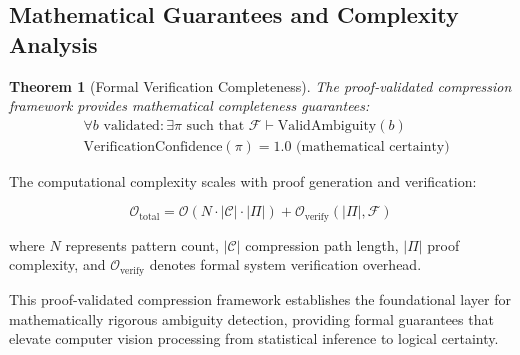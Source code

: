 \documentclass[11pt,a4paper]{article}
\newtheorem{theorem}{Theorem}[section]
\begin{document}
\subsection{Mathematical Guarantees and Complexity Analysis}

\begin{theorem}[Formal Verification Completeness]
The proof-validated compression framework provides mathematical completeness guarantees:
\begin{align}
&\forall b \text{ validated}: \exists \pi \text{ such that } \mathcal{F} \vdash \text{ValidAmbiguity}(b) \label{eq:completeness}\\
&\text{VerificationConfidence}(\pi) = 1.0 \text{ (mathematical certainty)} \label{eq:certainty}
\end{align}
\end{theorem}

The computational complexity scales with proof generation and verification:

\begin{equation}
\mathcal{O}_{\text{total}} = \mathcal{O}(N \cdot |\mathcal{C}| \cdot |\Pi|) + \mathcal{O}_{\text{verify}}(|\Pi|, \mathcal{F})
\label{eq:computational-complexity}
\end{equation}

where $N$ represents pattern count, $|\mathcal{C}|$ compression path length, $|\Pi|$ proof complexity, and $\mathcal{O}_{\text{verify}}$ denotes formal system verification overhead.

This proof-validated compression framework establishes the foundational layer for mathematically rigorous ambiguity detection, providing formal guarantees that elevate computer vision processing from statistical inference to logical certainty.
\end{document}
